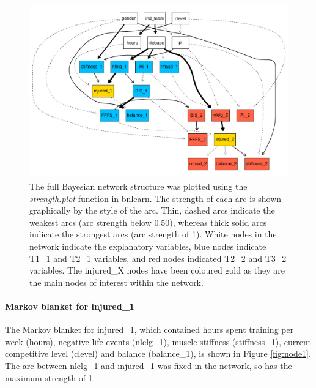 \documentclass[man,floatsintext]{apa6}
\let\oldparagraph\paragraph
\renewcommand{\paragraph}[1]{\oldparagraph{#1}\mbox{}}
\begin{document}
\newpage
\begin{landscape}

\begin{figure}
\centering
\includegraphics{full_phd_files/figure-latex/networkstructure-1.pdf}
\caption{\label{fig:networkstructure}The full Bayesian network structure was plotted using the \emph{strength.plot} function in bnlearn. The strength of each arc is shown graphically by the style of the arc. Thin, dashed arcs indicate the weakest arcs (arc strength below 0.50), whereas thick solid arcs indicate the strongest arcs (arc strength of 1). White nodes in the network indicate the explanatory variables, blue nodes indicate T1\_1 and T2\_1 variables, and red nodes indicated T2\_2 and T3\_2 variables. The injured\_X nodes have been coloured gold as they are the main nodes of interest within the network.}
\end{figure}

\end{landscape}

\hypertarget{markov-blanket-for-injured_1}{%
\paragraph{Markov blanket for injured\_1}\label{markov-blanket-for-injured_1}}

The Markov blanket for injured\_1, which contained hours spent training per week (hours), negative life events (nlelg\_1), muscle stiffness (stiffness\_1), current competitive level (clevel) and balance (balance\_1), is shown in Figure \ref{fig:node1}.
The arc between nlelg\_1 and injured\_1 was fixed in the network, so has the maximum strength of 1.
\end{document}
